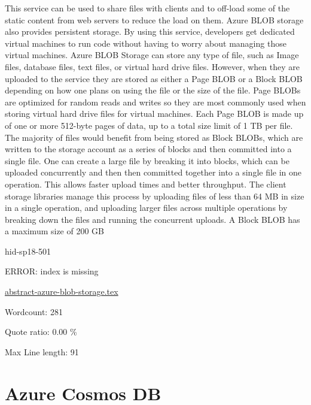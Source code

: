 This service can be used to share files with clients and to off-load some of the
static content from web servers to reduce the load on them. Azure BLOB storage
also provides persistent storage. By using this service, developers get
dedicated virtual machines to run code without having to worry about managing
those virtual machines. Azure BLOB Storage can store any type of file, such as
Image files, database files, text files, or virtual hard drive files. However,
when they are uploaded to the service they are stored as either a Page BLOB or a
Block BLOB depending on how one plans on using the file or the size of the file.
Page BLOBs are optimized for random reads and writes so they are most commonly
used when storing virtual hard drive files for virtual machines. Each Page BLOB
is made up of one or more 512-byte pages of data, up to a total size limit of 1
TB per file. The majority of files would benefit from being stored as Block
BLOBs, which are written to the storage account as a series of blocks and then
committed into a single file. One can create a large file by breaking it into
blocks, which can be uploaded concurrently and then then committed together into
a single file in one operation. This allows faster upload times and better
throughput. The client storage libraries manage this process by uploading files
of less than 64 MB in size in a single operation, and uploading larger files
across multiple operations by breaking down the files and running the concurrent
uploads. A Block BLOB has a maximum size of 200 GB~\cite{hid-sp18-501-RedGate}



\begin{IU}

hid-sp18-501

ERROR: index is missing

\href{https://github.com/cloudmesh-community/hid-sp18-501/blob/master//technology/abstract-azure-blob-storage.tex}{abstract-azure-blob-storage.tex}

 

Wordcount: 281


Quote ratio: 0.00 \%
 
Max Line length: 91
\end{IU}

\section{Azure Cosmos DB}


